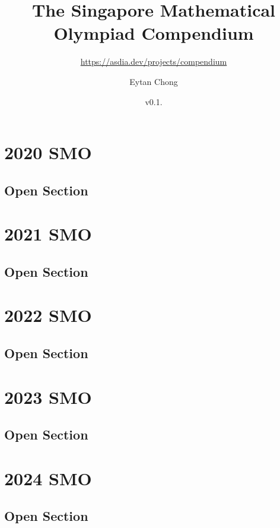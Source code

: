 \documentclass[a4paper,listof=totoc,bibliography=totoc,openany]{scrbook}
\title{The Singapore Mathematical Olympiad Compendium}
\subtitle{\url{https://asdia.dev/projects/compendium}}
\author{Eytan Chong}
\date{v0.1.\datetwo}
\begin{document}
\maketitle
\tableofcontents




\chapter{2020 SMO}
\section{Open Section}


\chapter{2021 SMO}
\section{Open Section}


\chapter{2022 SMO}
\section{Open Section}



\chapter{2023 SMO}
\section{Open Section}



\chapter{2024 SMO}
\section{Open Section}


\end{document}
